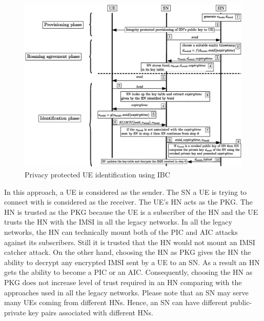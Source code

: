 \documentclass[lnicst,sechang,a4paper]{svmultln}
\begin{document}
\begin{figure}
\begin{center}
  \includegraphics[width=.98\textwidth]{solution_based_on_ibc.eps}
\caption{Privacy protected UE identification using IBC}
\label{fig:solution_ibc}       %
\end{center}
\end{figure}


In this approach, a UE is considered as the sender. The SN a UE is trying to connect with is considered as the receiver. The UE's HN acts as the PKG. The HN is trusted as the PKG because the UE is a subscriber of the HN and the UE trusts the HN with the IMSI in all the legacy networks. In all the legacy networks, the HN can technically mount both of the PIC and AIC attacks against its subscribers. Still it is trusted that the HN would not mount an IMSI catcher attack. On the other hand, choosing the HN as PKG gives the HN the ability to decrypt any encrypted IMSI sent by a UE to an SN. As a result an HN gets the ability to become a PIC or an AIC. Consequently, choosing the HN as PKG does not increase level of trust required in an HN comparing with the approaches used in all the legacy networks. Please note that an SN may serve many UEs coming from different HNs. Hence, an SN can have different public-private key pairs associated with different HNs. 
\end{document}
